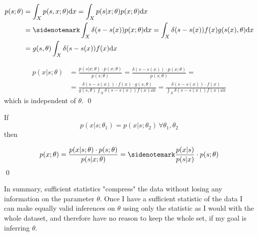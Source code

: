 \begin{example}
	\begin{align*}
	p(s;\theta) &= \int_X p(s,x;\theta)\dd x = \int_X p(s|x;\theta)p(x;\theta)\dd x \\
	&= \sidenotemark \int_X \delta(s-s(x))p(x;\theta) \dd x = \int_X \delta(s-s(x))f(x)g(s(x),\theta) \dd x \\
	&= g(s,\theta)\int_X \delta(s-s(x))f(x)\dd x
	\end{align*}
	 
	\begin{align*}
	p(x|s;\theta) &= \frac{p(s|x;\theta)\cdot p(x;\theta)}{p(s;\theta)} = \frac{\delta(s-s(x))\cdot p(x;\theta)}{p(s;\theta)} =\\
	&= \frac{\delta(s-s(x))\cdot f(x)\cdot g(s,\theta)}{g(s,\theta)\int_X \delta(s-s(x))f(x)\dd x} = \frac{\delta(s-s(x))\cdot f(x)}{\int_X\delta(s-s(x))f(x)\dd x}	
	\end{align*}
	which is independent of $\theta$. \qed	
\end{example}

\begin{example}
	If
	\[
	p(x | s;\theta_1) = p(x | s;\theta_2) \, \forall \theta_1,\theta_2
	\]
	then 
	
	\[
	p(x;\theta)=\frac{p(x|s;\theta)\cdot p(s;\theta)}{p(s|x;\theta)} =\sidenotemark \frac{p(x|s)}{p(s|x)}\cdot p(s;\theta)
	\]
	\qed
\end{example}

In summary, sufficient statistics "compress" the data without losing any information on the parameter $\theta$. Once I have a sufficient statistic of the data I can make equally valid inferences on $\theta$ using only the statistic as I would with the whole dataset, and therefore have no reason to keep the whole set, if my goal is inferring $\theta$. 

